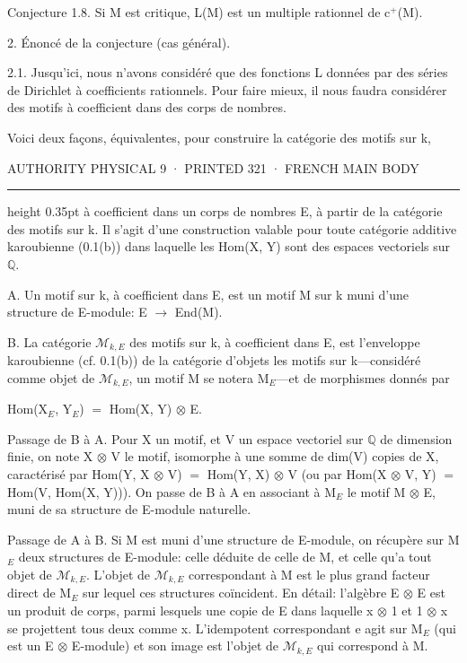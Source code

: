 \documentclass[10pt,twoside]{article}
\newcommand{\PageUnit}[3]{%
  \par\noindent\hypertarget{record-#1}{}%
  \pdfbookmark[1]{Authority page #1 · printed #2}{bookmark-#1}%
  {\sffamily\footnotesize\color{D030Muted}AUTHORITY PHYSICAL #1 · PRINTED #2 · #3}%
  \par\vspace{0.35em}\hrule height 0.35pt\vspace{0.8em}}
\begin{document}
Conjecture 1.8. Si M est critique, L(M) est un multiple rationnel de c\ensuremath{^{+}}(M).\par
2. Énoncé de la conjecture (cas général).\par
2.1. Jusqu’ici, nous n’avons considéré que des fonctions L données par des séries de Dirichlet à coefficients rationnels. Pour faire mieux, il nous faudra considérer des motifs à coefficient dans des corps de nombres.\par
Voici deux façons, équivalentes, pour construire la catégorie des motifs sur k,\par
\clearpage
\PageUnit{9}{321}{FRENCH MAIN BODY}
à coefficient dans un corps de nombres E, à partir de la catégorie des motifs sur k. Il s’agit d’une construction valable pour toute catégorie additive karoubienne (0.1(b)) dans laquelle les Hom(X, Y) sont des espaces vectoriels sur \ensuremath{ℚ}.\par
A. Un motif sur k, à coefficient dans E, est un motif M sur k muni d’une structure de E-module: E \ensuremath{→} End(M).\par
B. La catégorie \ensuremath{ℳ}\ensuremath{_{k,E}} des motifs sur k, à coefficient dans E, est l’enveloppe karoubienne (cf. 0.1(b)) de la catégorie d’objets les motifs sur k—considéré comme objet de \ensuremath{ℳ}\ensuremath{_{k,E}}, un motif M se notera M\ensuremath{_{E}}—et de morphismes donnés par\par
Hom(X\ensuremath{_{E}}, Y\ensuremath{_{E}}) \ensuremath{=} Hom(X, Y) \ensuremath{⊗} E.\par
Passage de B à A. Pour X un motif, et V un espace vectoriel sur \ensuremath{ℚ} de dimension finie, on note X \ensuremath{⊗} V le motif, isomorphe à une somme de dim(V) copies de X, caractérisé par Hom(Y, X \ensuremath{⊗} V) \ensuremath{=} Hom(Y, X) \ensuremath{⊗} V (ou par Hom(X \ensuremath{⊗} V, Y) \ensuremath{=} Hom(V, Hom(X, Y))). On passe de B à A en associant à M\ensuremath{_{E}} le motif M \ensuremath{⊗} E, muni de sa structure de E-module naturelle.\par
Passage de A à B. Si M est muni d’une structure de E-module, on récupère sur M\ensuremath{_{E}} deux structures de E-module: celle déduite de celle de M, et celle qu’a tout objet de \ensuremath{ℳ}\ensuremath{_{k,E}}. L’objet de \ensuremath{ℳ}\ensuremath{_{k,E}} correspondant à M est le plus grand facteur direct de M\ensuremath{_{E}} sur lequel ces structures coïncident. En détail: l’algèbre E \ensuremath{⊗} E est un produit de corps, parmi lesquels une copie de E dans laquelle x \ensuremath{⊗} 1 et 1 \ensuremath{⊗} x se projettent tous deux comme x. L’idempotent correspondant e agit sur M\ensuremath{_{E}} (qui est un E \ensuremath{⊗} E-module) et son image est l’objet de \ensuremath{ℳ}\ensuremath{_{k,E}} qui correspond à M.\par
\end{document}
